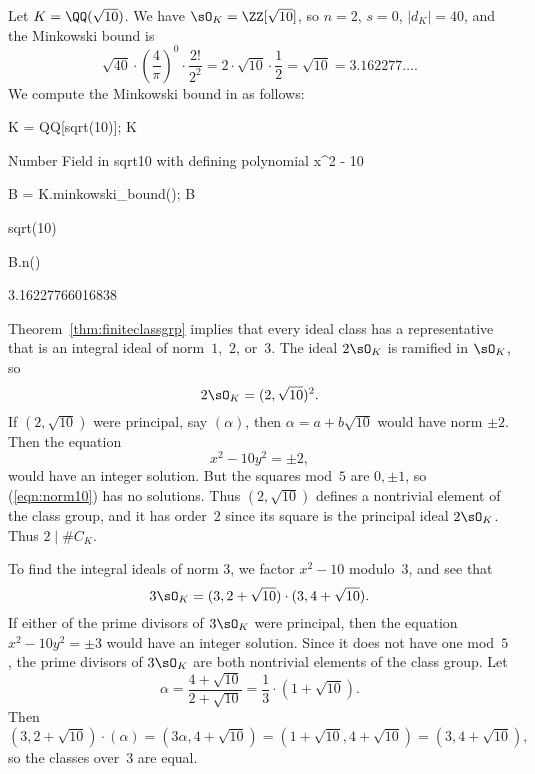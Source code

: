 \begin{example}
	Let $K=\QQ(\sqrt{10})$. We have $\sO_K = \ZZ[\sqrt{10}]$,
	so $n=2$, $s=0$, $|d_K| = 40$, and the Minkowski bound is
	\[
		\sqrt{40}\cdot \left(\frac{4}{\pi}\right)^0 \cdot \frac{2!}{2^2}
		= 2\cdot \sqrt{10} \cdot \frac{1}{2} = \sqrt{10} = 3.162277\dots.
	\]
	We compute the Minkowski bound in {\Sage} as follows:
	\begin{sagecode}
		\begin{sagecell}
			K = QQ[sqrt(10)]; K
		\end{sagecell}
		\begin{sageout}
			Number Field in sqrt10 with defining polynomial x^2 - 10
		\end{sageout}
		\begin{sagecell}
			B = K.minkowski_bound(); B
		\end{sagecell}
		\begin{sageout}
			sqrt(10)
		\end{sageout}
		\begin{sagecell}
			B.n()
		\end{sagecell}
		\begin{sageout}
			3.16227766016838
		\end{sageout}
	\end{sagecode}
	Theorem~\ref{thm:finiteclassgrp} implies that every ideal class has a
	representative that is an integral ideal of norm~$1$,~$2$, or~$3$.
	The ideal $2\sO_K$ is ramified in $\sO_K$, so
	$$
	2\sO_K = (2,\sqrt{10})^2.
	$$
	If $(2,\sqrt{10})$ were principal, say $(\alpha)$, then
	$\alpha=a+b\sqrt{10}$ would have norm $\pm 2$.
	Then the equation
	\begin{equation}\label{eqn:norm10}
	x^2 - 10y^2 = \pm 2,
	\end{equation}
	would have an integer solution.  But the squares mod~$5$ are
	$0,\pm 1$, so (\ref{eqn:norm10}) has no solutions.
	Thus $(2,\sqrt{10})$ defines a nontrivial element of the class group,
	and it has order~$2$ since its square is the principal ideal $2\sO_K$.
	Thus $2\mid \#C_K$.

	To find the integral ideals of norm $3$, we
	factor $x^2-10$ modulo~$3$, and see that
	$$
	3\sO_K  = (3,2+\sqrt{10}) \cdot (3,4+\sqrt{10}).
	$$
	If either of the prime divisors of $3\sO_K$ were principal,
	then the equation $x^2-10y^2 = \pm 3$ would have an integer
	solution.  Since it does not have one mod~$5$, the prime divisors
	of $3\sO_K$ are both nontrivial elements of the class
	group. Let
	$$
	\alpha = \frac{4+\sqrt{10}}{2+\sqrt{10}} = \frac{1}{3}\cdot (1+\sqrt{10}).
	$$
	Then
	$$
	(3,2+\sqrt{10})\cdot (\alpha) =  (3\alpha, 4+\sqrt{10})
	=  (1+\sqrt{10}, 4+\sqrt{10})
	=  (3, 4+\sqrt{10}),
	$$
	so the classes over~$3$ are equal.


\end{example}
